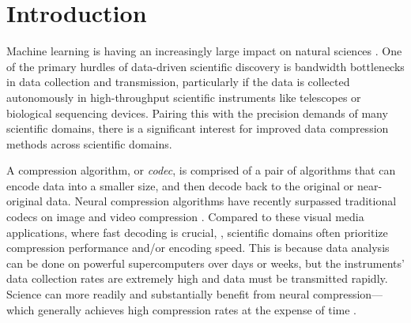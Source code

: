 \section{Introduction}
\label{sec:intro}
Machine learning is having an increasingly large impact on natural sciences \citep{RevModPhys.91.045002,2023Natur.620...47W}. One of the primary hurdles of data-driven scientific discovery is bandwidth bottlenecks in data collection and transmission, particularly if the data is collected autonomously in high-throughput scientific instruments like telescopes or biological sequencing devices. Pairing this with the precision demands of many scientific domains, there is a significant interest for improved data compression methods across scientific domains.


A compression algorithm, or \emph{codec}, is comprised of a pair of algorithms that can encode data into a smaller size, and then decode back to the original or near-original data. Neural compression algorithms \citep{yang2023introduction} have recently surpassed traditional codecs on image \citep{balle2017end, yang2020improving, he2022elic} and video compression \citep{lu2019dvc, agustsson2020scale, yang2021hierarchical, mentzer2022vct}. 
Compared to these visual media applications, where fast decoding is crucial, \citep{minnen_current_2021}, scientific domains often prioritize compression performance and/or encoding speed. This is because data analysis can be done on powerful supercomputers over days or weeks, but the instruments' data collection rates are extremely high and data must be transmitted rapidly. Science can more readily and substantially benefit from neural compression—which generally achieves high compression rates at the expense of time \citep{yang2023computationally}.


